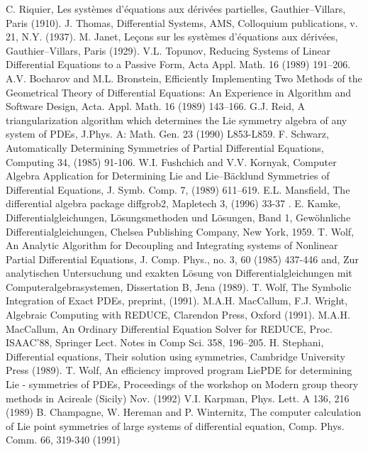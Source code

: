 \documentclass[12pt]{article}
\begin{document}
\begin{thebibliography}{99}
 C. Riquier, Les syst\`{e}mes d'\'{e}quations aux d\'{e}riv\'{e}es
partielles, Gauthier--Villars, Paris (1910).
 J. Thomas, Differential Systems, AMS, Colloquium
publications, v. 21, N.Y. (1937).
 M. Janet, Le\c{c}ons sur les syst\`{e}mes d'\'{e}quations aux 
d\'{e}riv\'{e}es, Gauthier--Villars, Paris (1929).
 V.L. Topunov, Reducing Systems of Linear Differential
Equations to a Passive Form, Acta Appl. Math. 16 (1989) 191--206.
 A.V. Bocharov and M.L. Bronstein, Efficiently
Implementing Two Methods of the Geometrical Theory of Differential
Equations: An Experience in Algorithm and Software Design, Acta. Appl.
Math. 16 (1989) 143--166.
 G.J. Reid, A triangularization algorithm which
determines the Lie symmetry algebra of any system of PDEs, J.Phys. A:
Math. Gen. 23 (1990) L853-L859.
 F. Schwarz, Automatically Determining Symmetries of Partial
Differential Equations, Computing 34, (1985) 91-106.
 W.I. Fushchich and V.V. Kornyak, Computer Algebra
Application for Determining Lie and Lie--B\"{a}cklund Symmetries of
Differential Equations, J. Symb. Comp. 7, (1989) 611--619.
 E.L. Mansfield,
The differential algebra package diffgrob2, Mapletech 3, (1996) 33-37 .
 E. Kamke, Differentialgleichungen, L\"{o}sungsmethoden
und L\"{o}sungen, Band 1, Gew\"{o}hnliche Differentialgleichungen,
Chelsea Publishing Company, New York, 1959.
 T. Wolf, An Analytic Algorithm for Decoupling and Integrating
systems of Nonlinear Partial Differential Equations, J. Comp. Phys.,
no. 3, 60 (1985) 437-446 and, Zur analytischen Untersuchung und exakten
L\"{o}sung von Differentialgleichungen mit Computeralgebrasystemen,
Dissertation B, Jena (1989).
 T. Wolf, The Symbolic Integration of Exact PDEs,
preprint, (1991).
 M.A.H. MacCallum, F.J. Wright, Algebraic Computing with REDUCE,
Clarendon Press, Oxford (1991).
 M.A.H. MacCallum, An Ordinary Differential Equation
Solver for REDUCE, Proc. ISAAC'88, Springer Lect. Notes in Comp Sci.
358, 196--205.
 H. Stephani, Differential equations, Their solution using
symmetries, Cambridge University Press (1989).
 T. Wolf, An efficiency improved program {\sc LiePDE}
for determining Lie - symmetries of PDEs, Proceedings of the workshop on
Modern group theory methods in Acireale (Sicily) Nov. (1992)
 V.I. Karpman, Phys. Lett. A 136, 216 (1989)
 B. Champagne, W. Hereman and P. Winternitz, The computer
      calculation of Lie point symmetries of large systems of differential
      equation, Comp. Phys. Comm. 66, 319-340 (1991)

\end{thebibliography}
 
\end{document}
